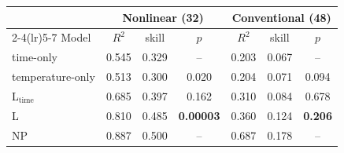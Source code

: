 \begin{tabular}{lcccccc}
\toprule
 & \multicolumn{3}{c}{Nonlinear (32)} & \multicolumn{3}{c}{Conventional (48)}\\
\cmidrule(lr){2-4}\cmidrule(lr){5-7}
Model & $R^2$ & skill & $p$ & $R^2$ & skill & $p$\\
\midrule
time-only & 0.545 & 0.329 & -- & 0.203 & 0.067 & --\\
temperature-only & 0.513 & 0.300 & 0.020 & 0.204 & 0.071 & 0.094\\
L$_{\mathrm{time}}$ & 0.685 & 0.397 & 0.162 & 0.310 & 0.084 & 0.678\\
L & 0.810 & 0.485 & \textbf{0.00003} & 0.360 & 0.124 & \textbf{0.206}\\
\midrule
NP & 0.887 & 0.500 & -- & 0.687 & 0.178 & --\\
\bottomrule
\end{tabular}
